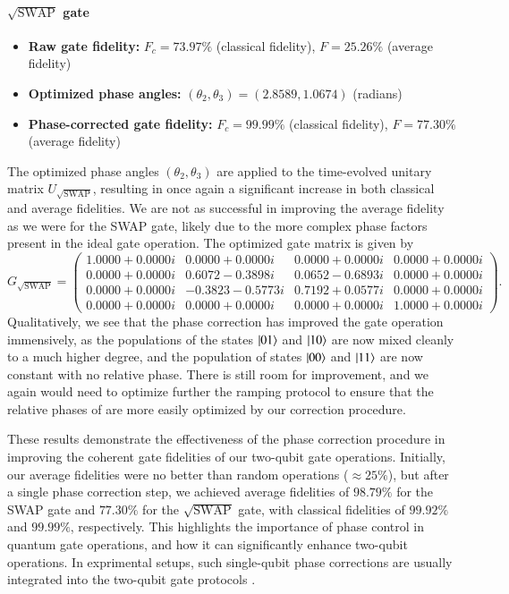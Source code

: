 \documentclass{subfiles}
\begin{document}
\paragraph{$\sqrt{\text{SWAP}}$ gate}
\begin{itemize}
    \item \textbf{Raw gate fidelity:} $F_c = 73.97\%$ (classical fidelity), $F = 25.26\%$ (average fidelity)
    \item \textbf{Optimized phase angles:} $(\theta_2, \theta_3) = (2.8589, 1.0674)$ (radians)
    \item \textbf{Phase-corrected gate fidelity:} $F_c = 99.99\%$ (classical fidelity), $F = 77.30\%$ (average fidelity)
\end{itemize}
The optimized phase angles $(\theta_2, \theta_3)$ are applied to the time-evolved unitary matrix $U_{\sqrt{\text{SWAP}}}$, resulting in once again a significant increase in both classical and average fidelities. We are not as successful in improving the average fidelity as we were for the SWAP gate, likely due to the more complex phase factors present in the ideal gate operation.
The optimized gate matrix is given by
\begin{equation}
G_{\sqrt{\mathrm{SWAP}}}
=
\begin{pmatrix}
 1.0000 + 0.0000i & 0.0000 + 0.0000i & 0.0000 + 0.0000i & 0.0000 + 0.0000i\\
 0.0000 + 0.0000i & 0.6072 - 0.3898i & 0.0652 - 0.6893i & 0.0000 + 0.0000i\\
 0.0000 + 0.0000i & -0.3823 - 0.5773i & 0.7192 + 0.0577i & 0.0000 + 0.0000i\\
 0.0000 + 0.0000i & 0.0000 + 0.0000i & 0.0000 + 0.0000i & 1.0000 + 0.0000i
\end{pmatrix}.
\end{equation}
Qualitatively, we see that the phase correction has improved the gate operation immensively, as the populations of the states $\ket{01}$ and $\ket{10}$ are now mixed cleanly to a much higher degree, and the population of states $\ket{00}$ and $\ket{11}$ are now constant with no relative phase. There is still room for improvement, and we again would need to optimize further the ramping protocol to ensure that the relative phases of are more easily optimized by our correction procedure.

These results demonstrate the effectiveness of the phase correction procedure in improving the coherent gate fidelities of our two-qubit gate operations. Initially, our average fidelities were no better than random operations ($\approx 25\%$), but after a single phase correction step, we achieved average fidelities of $98.79\%$ for the SWAP gate and $77.30\%$ for the $\sqrt{\text{SWAP}}$ gate, with classical fidelities of $99.92\%$ and $99.99\%$, respectively. This highlights the importance of phase control in quantum gate operations, and how it can significantly enhance two-qubit operations. In exprimental setups, such single-qubit phase corrections are usually integrated into the two-qubit gate protocols \cite{nielsen2010quantum}.
\end{document}

